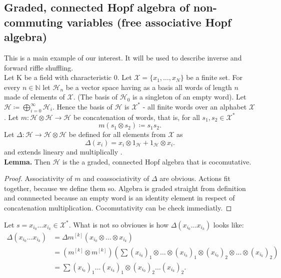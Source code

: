 \documentclass[a4paper, 12pt]{report}
\begin{document}
\subsection{Graded, connected Hopf algebra of non-commuting variables (free associative Hopf algebra)}
This is a main example of our interest. It will be used to describe inverse and forward riffle shuffling.\\
Let K be a field with characteristic 0. 
Let $\mathcal{X} = \{x_1, \dots, x_N\}$ be a finite set. For every $n \in \mathbb{N}$ let 
$\mathcal{H}_n$ be a vector space having as a basis all words of length $n$ made of elements 
of $\mathcal{X}$. (The basis of $\mathcal{H}_0$ is a singleton of an empty word). 
Let $\mathcal{H} \coloneqq \displaystyle\bigoplus^{\infty}_{i = 0} \mathcal{H}_i$. Hence 
the basis of $\mathcal{H}$ is $\mathcal{X}^*$ - all finite words over an alphabet $\mathcal{X}$.
Let $m : \mathcal{H} \otimes \mathcal{H} \to \mathcal{H}$ be concatenation of words, 
that is, for all $s_1, s_2 \in \mathcal{X}^*$
\begin{equation*}
m(s_1 \otimes s_2) \coloneqq s_1s_2.
\end{equation*}
Let $\Delta : \mathcal{H} \to \mathcal{H} \otimes \mathcal{H}$ be defined for all elements from 
$\mathcal{X}$ as
\begin{equation*}
\Delta(x_i) = x_i \otimes 1_\mathcal{H} + 1_\mathcal{H} \otimes x_i.
\end{equation*}
and extends lineary and multiplically .\\
\textbf{Lemma. } Then $\mathcal{H}$ is the a graded, connected Hopf algebra that is cocomutative.
\begin{proof}
Associativity of $m$ and coassociativity of $\Delta$ are obvious. Actions fit together, 
because we define them so. Algebra is graded straight from definition and connnected because an empty word 
is an identity element in respect of concatenation multiplication. Cocomutativity can be check immediatly.
\end{proof}
\noindent Let $s = x_{i_0}\dots x_{i_k} \in \mathcal{X}^*$. What is not so obvioues is 
how $\Delta(x_{i_0}\dots x_{i_k})$ looks like:
\begin{align}
\Delta(x_{i_0}\dots x_{i_k}) &= \Delta m^{[k]}(x_{i_0} \otimes \dots \otimes x_{i_k}) \\ 
&= (m^{[k]} \otimes m^{[k]}) \left(\sum (x_{i_0})_1 \otimes \dots \otimes (x_{i_k})_1 \otimes 
(x_{i_0})_2 \otimes \dots \otimes (x_{i_k})_2\right) \\ 
&= \sum (x_{i_0})_1 \dots (x_{i_k})_1 \otimes 
(x_{i_0})_2 \dots (x_{i_k})_2.
\end{align}
\end{document}
